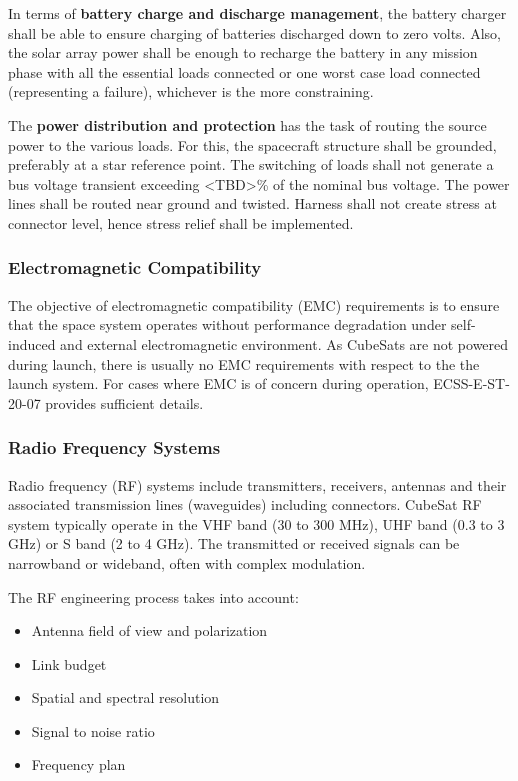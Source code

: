In terms of \textbf{battery charge and discharge management}, the battery charger shall be able to ensure charging of batteries discharged down to zero volts. Also, the solar array power shall be enough to recharge the battery in any mission phase with all the essential loads connected or one worst case load connected (representing a failure), whichever is the more constraining.

The \textbf{power distribution and protection} has the task of routing the source power to the various loads. For this, the spacecraft structure shall be grounded, preferably at a star reference point. The switching of loads shall not generate a bus voltage transient exceeding <TBD>\% of the nominal bus voltage. The power lines shall be routed near ground and twisted. Harness shall not create stress at connector level, hence stress relief shall be implemented.

\subsubsection{Electromagnetic Compatibility}

The objective of electromagnetic compatibility (EMC) requirements is to ensure that the space system operates without performance degradation under self-induced and external electromagnetic environment. As CubeSats are not powered during launch, there is usually no EMC requirements with respect to the the launch system. For cases where EMC is of concern during operation, ECSS-E-ST-20-07 \cite{} provides sufficient details.

\subsubsection{Radio Frequency Systems}

Radio frequency (RF) systems include transmitters, receivers, antennas and their  associated transmission lines (waveguides) including connectors. CubeSat RF system typically operate in the VHF band (30 to 300 MHz), UHF band (0.3 to 3 GHz) or S band (2 to 4 GHz). The transmitted or received signals can be narrowband or wideband, often with complex modulation. 

The RF engineering process takes into account:

\begin{itemize}
\item Antenna field of view and polarization
\item Link budget
\item Spatial and spectral resolution
\item Signal to noise ratio
\item Frequency plan
\end{itemize}


